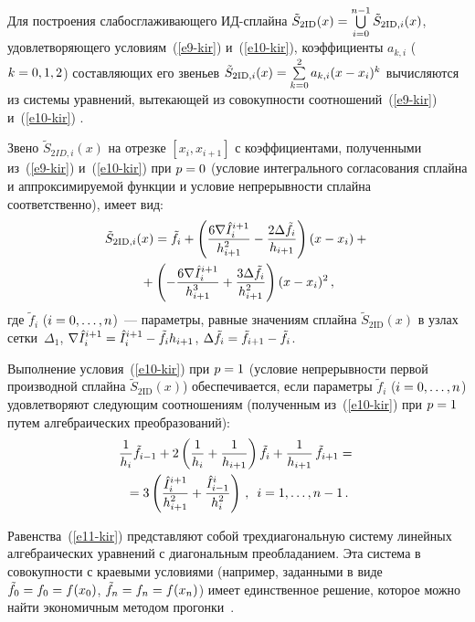 \begin{multicols}{2}
  Для построения слабосглаживающего ИД-сплай\-на $\tilde{S}_{2\mathrm{ID}}(x)\hm= 
\mathop{\bigcup}\limits_{i=0}^{n-1} \tilde{S}_{2\mathrm{ID},i}(x)$, удовлетворя\-ющего 
условиям~(\ref{e9-kir}) и~(\ref{e10-kir}), коэффициенты $a_{k,i}$ 
($k\hm=0,1,2$) составляющих его звеньев 
$\tilde{S}_{2\mathrm{ID},i}(x)\hm=\sum\limits_{k=0}^2 a_{k,i}(x-x_i)^k$ вычисляются из 
системы уравнений, вытекающей из совокупности соотношений~(\ref{e9-kir}) 
и~(\ref{e10-kir}) . 
  
  Звено $\tilde{S}_{2ID,i}(x)$ на отрезке $[x_i,x_{i+1}]$ с коэффициентами, 
полученными из~(\ref{e9-kir}) и~(\ref{e10-kir}) при $p\hm=0$ (условие 
интегрального согласования сплайна и аппроксимируемой функции и условие 
непрерыв\-ности сплайна соответственно), имеет вид:
 \begin{multline*}
  \tilde{S}_{2\mathrm{ID},i}(x) =\tilde{f}_i +\left( \displaystyle\frac{\displaystyle 6\nabla \hat{I}_i^{i+1}\mathstrut}{\displaystyle h^2_{i+1}\mathstrut}-
\displaystyle\frac{\displaystyle 2\Delta \tilde{f}_i\mathstrut}{\displaystyle h_{i+1}\mathstrut}\right)(x-x_i) + {}\\
{}+\left( -\displaystyle\frac{\displaystyle 6\nabla 
\hat{I}_i^{i+1}\mathstrut}{\displaystyle h^3_{i+1}\mathstrut}+ \displaystyle\frac{\displaystyle 3\Delta\tilde{f}_i\mathstrut}{\displaystyle h^2_{i+1}\mathstrut} \right) (x-x_i)^2\,,
  \end{multline*}
где $\tilde{f}_i$ ($i\hm=0,\ldots , n$)~--- параметры, равные значениям сплайна 
$\tilde{S}_{2\mathrm{ID}}(x)$ в узлах сетки~$\Delta_1$, $\nabla \hat{I}_i^{i+1}\hm= 
\hat{I}_i^{i+1} \hm- \tilde{f}_i h_{i+1}$, $\Delta \tilde{f}_i\hm= \tilde{f}_{i+1}\hm- 
\tilde{f}_i$.
  
  Выполнение условия~(\ref{e10-kir}) при $p\hm=1$ (условие непрерывности 
первой производной сплайна $\tilde{S}_{2\mathrm{ID}}(x)$) обеспечивается, если 
параметры $\tilde{f}_i$ ($i\hm=0,\ldots ,n$) удовлетворяют следующим 
соотношениям (полученным из~(\ref{e10-kir}) при $p\hm=1$ путем 
алгебраических преобразований):
  \begin{multline}
  \displaystyle\frac{\displaystyle 1\mathstrut}{\displaystyle h_i\mathstrut} \tilde{f}_{i-1} +2\left( \displaystyle\frac{\displaystyle 1\mathstrut}{\displaystyle h_i\mathstrut} +\displaystyle\frac{\displaystyle 1\mathstrut}{\displaystyle h_{i+1}\mathstrut}\right) \tilde{f}_i 
+ \displaystyle\frac{\displaystyle 1\mathstrut}{\displaystyle h_{i+1}\mathstrut}\,\tilde{f}_{i+1} ={}\\
{}=3 \left( 
\displaystyle\frac{\displaystyle \hat{I}_i^{i+1}\mathstrut}{\displaystyle h^2_{i+1}\mathstrut}+\displaystyle\frac{\displaystyle \hat{I}_{i-1}^{i}\mathstrut}{\displaystyle h_i^2\mathstrut} \right)\,,\enskip i=1,\ldots , n-
1\,.
  \label{e11-kir}
  \end{multline}
  
  Равенства~(\ref{e11-kir}) представляют собой трехдиагональную систему 
линейных алгебраических уравнений с диагональным преобладанием. Эта 
система в совокупности с краевыми условиями (например, заданными в виде 
$\tilde{f}_0\hm= f_0\hm= f(x_0)$, $\tilde{f}_n\hm= f_n\hm= f(x_n)$) имеет 
единственное решение, которое можно найти экономичным методом 
прогонки~\cite{9-kir}.
  

\end{multicols}
